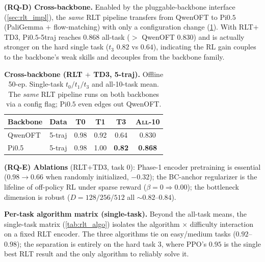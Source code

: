 \textbf{(RQ-D) Cross-backbone.} Enabled by the pluggable-backbone interface (\cref{sec:rlt_impl}), the \emph{same} RLT pipeline transfers from QwenOFT to Pi$0.5$ (PaliGemma $+$ flow-matching) with only a configuration change (\cref{tab:rlt_backbone}). With RLT$+$TD3, Pi$0.5$-5traj reaches $0.868$ all-task ($>$ QwenOFT $0.830$) and is actually stronger on the hard single task ($t_3$ $0.82$ vs $0.64$), indicating the RL gain couples to the backbone's weak skills and decouples from the backbone family.

\begin{table}[t]
    \centering
    \caption{\textbf{Cross-backbone (RLT $+$ TD3, 5-traj).} Offline 50-ep. Single-task $t_0/t_1/t_3$ and all-10-task mean. The \emph{same} RLT pipeline runs on both backbones via a config flag; Pi$0.5$ even edges out QwenOFT.}
    \label{tab:rlt_backbone}
    \vspace{0.3em}
    \footnotesize
    \setlength{\tabcolsep}{7pt}
    \renewcommand{\arraystretch}{1.15}
    \begin{tabular}{@{}l l ccc c@{}}
        \toprule
        \textbf{Backbone} & \textbf{Data} & \textsc{T0} & \textsc{T1} & \textsc{T3} & \textsc{All-10} \\
        \midrule
        QwenOFT & 5-traj & 0.98 & 0.92 & 0.64 & 0.830 \\
        Pi0.5   & 5-traj & 0.98 & 1.00 & \textbf{0.82} & \textbf{0.868} \\
        \bottomrule
    \end{tabular}
\end{table}

\textbf{(RQ-E) Ablations} (RLT$+$TD3, task $0$): Phase-1 encoder pretraining is essential ($0.98\!\to\!0.66$ when randomly initialized, $-0.32$); the BC-anchor regularizer is the lifeline of off-policy RL under sparse reward ($\beta{=}0\!\Rightarrow\!0.00$); the bottleneck dimension is robust ($D{=}128/256/512$ all ${\sim}0.82$--$0.84$).

\textbf{Per-task algorithm matrix (single-task).} Beyond the all-task means, the single-task matrix (\cref{tab:rlt_algo}) isolates the algorithm $\times$ difficulty interaction on a fixed RLT encoder. The three algorithms tie on easy/medium tasks ($0.92$--$0.98$); the separation is entirely on the hard task $3$, where PPO's $0.95$ is the single best RLT result and the only algorithm to reliably solve it.

